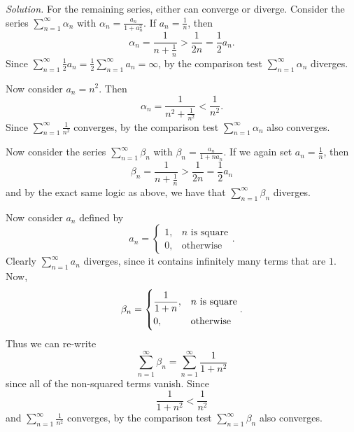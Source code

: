 \documentclass{article}
\begin{document}
\textit{Solution.}
For the remaining series, either can converge or diverge. Consider the
series $\sum_{n = 1}^\infty \alpha_n$ with $\alpha_n = \frac{a_n}{1 +
a_n^2}$. If $a_n = \frac{1}{n}$, then
%
\begin{equation*}
    \alpha_n = \frac{1}{n + \frac{1}{n}} > \frac{1}{2 n} = \frac{1}{2} a_n
    .
\end{equation*}
%
Since $\sum_{n = 1}^\infty \frac{1}{2} a_n = \frac{1}{2}\sum_{n =
1}^\infty a_n = \infty$, by the comparison test $\sum_{n = 1}^\infty
\alpha_n$ diverges.

Now consider $a_n = n^2$. Then
%
\begin{equation*}
    \alpha_n = \frac{1}{n^2 + \frac{1}{n^2}} < \frac{1}{n^2}
    .
\end{equation*}
%
Since $\sum_{n = 1}^\infty \frac{1}{n^2}$ converges, by the comparison
test $\sum_{n = 1}^\infty \alpha_n$ also converges.

Now consider the series $\sum_{n = 1}^\infty \beta_n$ with $\beta_n =
\frac{a_n}{1 + n a_n}$. If we again set $a_n = \frac{1}{n}$, then
%
\begin{equation*}
    \beta_n = \frac{1}{n + \frac{1}{n}} > \frac{1}{2 n} = \frac{1}{2} a_n
\end{equation*}
%
and by the exact same logic as above, we have that $\sum_{n = 1}^\infty
\beta_n$ diverges.

Now consider $a_n$ defined by
%
\begin{equation*}
    a_n =
    \begin{cases}
        1,& \text{$n$ is square} \\
        0,& \text{otherwise}
    \end{cases}
    .
\end{equation*}
%
Clearly $\sum_{n = 1}^\infty a_n$ diverges, since it contains infinitely
many terms that are $1$. Now,
%
\begin{equation*}
    \beta_n =
    \begin{dcases}
        \frac{1}{1 + n},& \text{$n$ is square} \\
        0,& \text{otherwise}
    \end{dcases}
    .
\end{equation*}
%
Thus we can re-write
%
\begin{equation*}
    \sum_{n = 1}^\infty \beta_n = \sum_{n = 1}^\infty \frac{1}{1 + n^2}
\end{equation*}
%
since all of the non-squared terms vanish. Since
%
\begin{equation*}
    \frac{1}{1 + n^2} < \frac{1}{n^2}
\end{equation*}
%
and $\sum_{n = 1}^\infty \frac{1}{n^2}$ converges, by the comparison
test $\sum_{n = 1}^\infty \beta_n$ also converges.
\end{document}
